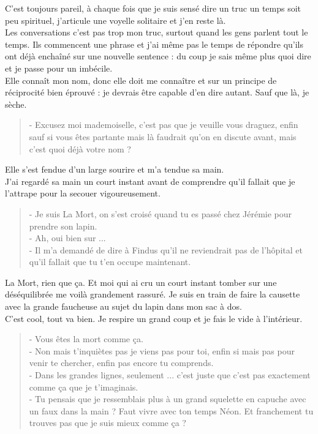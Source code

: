 C'est toujours pareil, à chaque fois que je suis sensé dire un truc un temps soit peu spirituel, j'articule une voyelle solitaire et j'en reste là. \\
Les conversations c'est pas trop mon truc, surtout quand les gens parlent tout le temps. Ils commencent une phrase et j'ai même pas le temps de répondre qu'ils ont déjà enchaîné sur une nouvelle sentence : du coup je sais même plus quoi dire et je passe pour un imbécile. \\
Elle connaît mon nom, donc elle doit me connaître et sur un principe de réciprocité bien éprouvé : je devrais être capable d'en dire autant. Sauf que là, je sèche. \\

\begin{quote}
- Excusez moi mademoiselle, c'est pas que je veuille vous draguez, enfin sauf si vous êtes partante mais là faudrait qu'on en discute avant, mais c'est quoi déjà votre nom ?
\end{quote}

Elle s'est fendue d'un large sourire et m'a tendue sa main. \\
J'ai regardé sa main un court instant avant de comprendre qu'il fallait que je l'attrape pour la secouer vigoureusement. \\

\begin{quote}
- Je suis La Mort, on s'est croisé quand tu es passé chez Jérémie pour prendre son lapin. \\
- Ah, oui bien sur ... \\
- Il m'a demandé de dire à Findus qu'il ne reviendrait pas de l’hôpital et qu'il fallait que tu t'en occupe maintenant. \\
\end{quote}

La Mort, rien que ça. Et moi qui ai cru un court instant tomber sur une déséquilibrée me voilà grandement rassuré. Je suis en train de faire la causette avec la grande faucheuse au sujet du lapin dans mon sac à dos. \\
C'est cool, tout va bien. Je respire un grand coup et je fais le vide à l'intérieur. \\

\begin{quote}
- Vous êtes la mort comme ça. \\
- Non mais t’inquiètes pas je viens pas pour toi, enfin si mais pas pour venir te chercher, enfin pas encore tu comprends. \\
- Dans les grandes lignes, seulement ... c'est juste que c'est pas exactement comme ça que je t'imaginais. \\
- Tu pensais que je ressemblais plus à un grand squelette en capuche avec un faux dans la main ? Faut vivre avec ton temps Néon. Et franchement tu trouves pas que je suis mieux comme ça ? \\
\end{quote}

